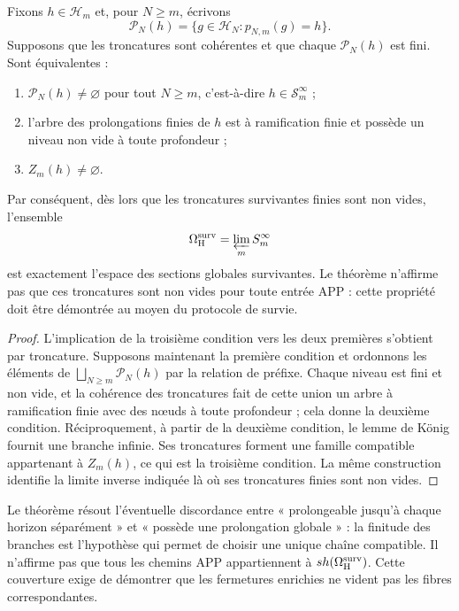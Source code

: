 \begin{theorem}
\label{thm:criterio-extension-superviviente}
Fixons \(h\in\mathcal H_m\) et, pour \(N\geq m\), écrivons
\[
 \mathcal P_N(h)=\{g\in\mathcal H_N:p_{N,m}(g)=h\}.
\]
Supposons que les troncatures sont cohérentes et que chaque
\(\mathcal P_N(h)\) est fini. Sont équivalentes :
\begin{enumerate}
  \item \(\mathcal P_N(h)\ne\varnothing\) pour tout \(N\geq m\), c'est-à-dire
  \(h\in\mathcal S_m^\infty\) ;
  \item l'arbre des prolongations finies de \(h\) est à ramification finie
  et possède un niveau non vide à toute profondeur ;
  \item \(Z_m(h)\ne\varnothing\).
\end{enumerate}
Par conséquent, dès lors que les troncatures survivantes finies sont non
vides, l'ensemble
\[
 \Omega_{\rm H}^{\rm surv}
 =\varprojlim_m\mathcal S_m^\infty
\]
est exactement l'espace des sections globales survivantes. Le théorème
n'affirme pas que ces troncatures sont non vides pour toute entrée APP : cette
propriété doit être démontrée au moyen du protocole de survie.
\end{theorem}

\begin{proof}
L'implication de la troisième condition vers les deux premières s'obtient par
troncature. Supposons maintenant la première condition et ordonnons les éléments de
\(\bigsqcup_{N\geq m}\mathcal P_N(h)\) par la relation de préfixe. Chaque niveau
est fini et non vide, et la cohérence des troncatures fait de cette union
un arbre à ramification finie avec des nœuds à toute profondeur ; cela donne la
deuxième condition. Réciproquement, à partir de la deuxième condition, le lemme de König
fournit une branche infinie. Ses troncatures forment une famille compatible
appartenant à \(Z_m(h)\), ce qui est la troisième condition. La même construction
identifie la limite inverse indiquée là où ses troncatures finies sont
non vides.
\end{proof}

Le théorème résout l'éventuelle discordance entre « prolongeable jusqu'à chaque
horizon séparément » et « possède une prolongation globale » : la finitude des
branches est l'hypothèse qui permet de choisir une unique chaîne compatible. Il
n'affirme pas que tous les chemins APP appartiennent à
\(\operatorname{sh}(\Omega_{\rm H}^{\rm surv})\). Cette couverture exige de démontrer
que les fermetures enrichies ne vident pas les fibres correspondantes.

